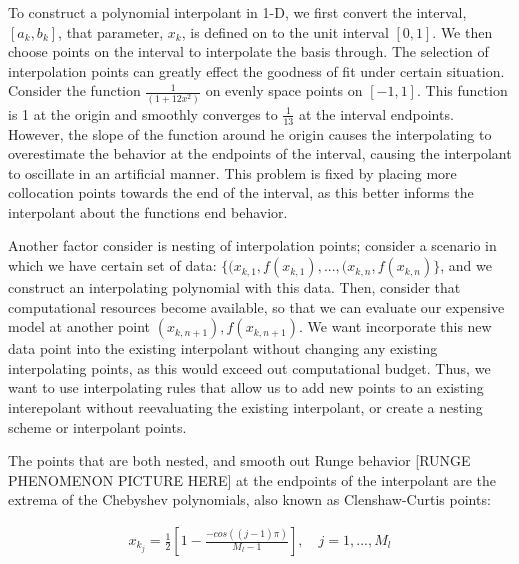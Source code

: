 \documentclass{article}
\begin{document}
\vspace{0.01cm}

 To construct a polynomial interpolant in 1-D, we first convert the interval, $[a_k, b_k]$, that  parameter, $x_k$, is defined on to the unit interval $[0,1]$. We then choose points on the interval to interpolate the basis through. The selection of interpolation points can greatly effect the goodness of fit under certain situation. Consider the function $\frac{1}{(1+12x^2)}$ on evenly space points on $[-1,1]$. This function is 1 at the origin and smoothly converges to $\frac{1}{13}$ at the interval endpoints. However, the slope of the function around he origin causes the interpolating to overestimate the behavior at the endpoints of the interval, causing the interpolant to oscillate in an artificial manner. This problem is fixed by placing more collocation points towards the end of the interval, as this better informs the interpolant about the functions end behavior.\\

\vspace{0.01cm}

Another factor consider is nesting of interpolation points; consider a scenario in which we have certain set of data: $\{(x_{k,1},f(x_{k,1}), ..., (x_{k,n}, f(x_{k,n})\}$, and we construct an interpolating polynomial with this data. Then, consider that computational resources become available, so that we can evaluate our expensive model at another point $(x_{k,n+1}), f(x_{k,n+1})$. We want incorporate this new data point into the existing interpolant without changing any existing interpolating points, as this would exceed out computational budget. Thus, we want to use interpolating rules that allow us to add new points to an existing interepolant without reevaluating the existing interpolant, or create a nesting scheme or interpolant points.\\

\vspace{0.01cm}
\noindent

The points that are both nested, and smooth out Runge behavior [RUNGE PHENOMENON PICTURE HERE] at the endpoints of the interpolant are the extrema of the Chebyshev polynomials, also known as Clenshaw-Curtis points:

\begin{align*}
x_{k_j} = \frac{1}{2}[1-\frac{-cos((j-1)\pi)}{M_l - 1}], \quad j = 1,..., M_l
\end{align*}
\end{document}
